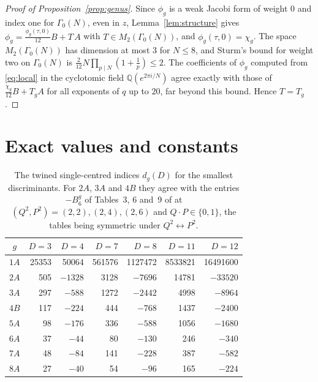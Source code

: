 \documentclass[11pt]{amsart}
\theoremstyle{definition}
\newcommand{\QQ}{\mathbb{Q}}
\begin{document}
\begin{proof}[Proof of Proposition~\ref{prop:genus}]
Since $\phi_g$ is a weak Jacobi form of weight $0$ and index one for $\Gamma_0(N)$, even in $z$, Lemma~\ref{lem:structure} gives $\phi_g=\frac{\phi_g(\tau,0)}{12}B+T\,A$ with $T\in M_2(\Gamma_0(N))$, and $\phi_g(\tau,0)=\chi_g$. The space $M_2(\Gamma_0(N))$ has dimension at most $3$ for $N\le8$, and Sturm's bound for weight two on $\Gamma_0(N)$ is $\frac{2}{12}N\prod_{p\mid N}(1+\frac1p)\le2$. The coefficients of $\phi_g$ computed from \eqref{eq:local} in the cyclotomic field $\QQ(e^{2\pi i/N})$ agree exactly with those of $\frac{\chi_g}{12}B+T_gA$ for all exponents of $q$ up to $20$, far beyond this bound. Hence $T=T_g$.
\end{proof}

\section{Exact values and constants}\label{app:tables}

\begin{table}[H]
\centering
\caption{The twined single-centred indices $d_g(D)$ for the smallest discriminants. For $2A$, $3A$ and $4B$ they agree with the entries $-B_6^{g}$ of Tables~3, 6 and~9 of \cite{GSSV23} at $(Q^2,P^2)=(2,2),(2,4),(2,6)$ and $Q\cdot P\in\{0,1\}$, the tables being symmetric under $Q^2\leftrightarrow P^2$.}
\label{tab:values}
\renewcommand{\arraystretch}{1.15}
\begin{tabular}{crrrrrr}
\toprule
$g$ & $D=3$ & $D=4$ & $D=7$ & $D=8$ & $D=11$ & $D=12$\\
\midrule
$1A$ & 25353 & 50064 & 561576 & 1127472 & 8533821 & 16491600\\
$2A$ & 505 & $-1328$ & 3128 & $-7696$ & 14781 & $-33520$\\
$3A$ & 297 & $-588$ & 1272 & $-2442$ & 4998 & $-8964$\\
$4B$ & 117 & $-224$ & 444 & $-768$ & 1437 & $-2400$\\
$5A$ & 98 & $-176$ & 336 & $-588$ & 1056 & $-1680$\\
$6A$ & 37 & $-44$ & 80 & $-130$ & 246 & $-340$\\
$7A$ & 48 & $-84$ & 141 & $-228$ & 387 & $-582$\\
$8A$ & 27 & $-40$ & 54 & $-96$ & 165 & $-224$\\
\bottomrule
\end{tabular}
\end{table}
\end{document}
